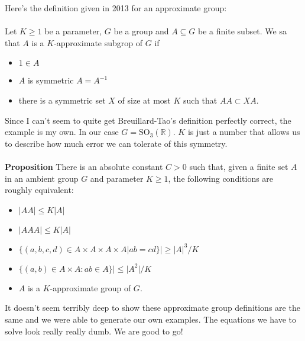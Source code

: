\documentclass[12pt]{article}
\begin{document}
\noindent Here's the definition given in 2013 for an approximate group: \\ \\
Let $K \geq 1$ be a parameter, $G$ be a group and $A \subseteq G$ be a finite subset.  We sa that $A$ is a $K$-approximate subgrop of $G$ if 
\begin{itemize}
\item $1 \in A$
\item $A$ is symmetric $A = A^{-1}$
\item there is a symmetric set $X$ of size at most $K$ such that $AA \subset XA$.
\end{itemize}
Since I can't seem to quite get Breuillard-Tao's definition perfectly correct, the example is my own. In our case $G = \text{SO}_3(\mathbb{R})$.  $K$ is just a number that allows us to describe how much error we can tolerate of this symmetry. \\ \\
\textbf{Proposition} There is an absolute constant $C > 0$ such that, given a finite set $A$ in an ambient group $G$ and parameter $K \geq 1$, the following conditions are roughly equivalent:
\begin{itemize}
\item $|AA| \leq K|A|$
\item $|AAA| \leq K|A|$
\item $\{(a,b,c,d) \in A \times A \times A \times A \big| ab=cd\} | \geq |A|^3/K$
\item $\{ (a,b) \in A \times A: ab \in A\}|\leq |A^2|/K$
\item $A$ is a $K$-approximate group of $G$.
\end{itemize}
It doesn't seem terribly deep to show these approximate group definitions are the same and we were able to generate our own examples.  The equations we have to solve look really really dumb.  We are good to go!
\vfill
\end{document}
